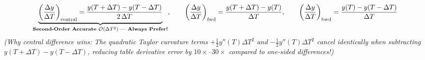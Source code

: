 \begin{formulacard}
\begin{enumerate}
  \begin{equation}\label{eq:18:finitediff}
    \underbrace{\left(\frac{\Delta y}{\Delta T}\right)_{\mathrm{central}} = \frac{y(T + \Delta T) - y(T - \Delta T)}{2\,\Delta T}}_{\text{\textbf{Second-Order Accurate }} \mathcal{O}(\Delta T^2)\text{ --- \textbf{Always Prefer!}}}, \qquad
    \left(\frac{\Delta y}{\Delta T}\right)_{\mathrm{fwd}} = \frac{y(T + \Delta T) - y(T)}{\Delta T}, \qquad
    \left(\frac{\Delta y}{\Delta T}\right)_{\mathrm{bwd}} = \frac{y(T) - y(T - \Delta T)}{\Delta T}
  \end{equation}
  \emph{(Why central difference wins: The quadratic Taylor curvature terms $+\frac{1}{2}y''(T)\Delta T^2$ and $-\frac{1}{2}y''(T)\Delta T^2$ cancel identically when subtracting $y(T+\Delta T) - y(T-\Delta T)$, reducing table derivative error by $10\times\text{--}30\times$ compared to one-sided differences!)}
\end{enumerate}
\end{formulacard}

